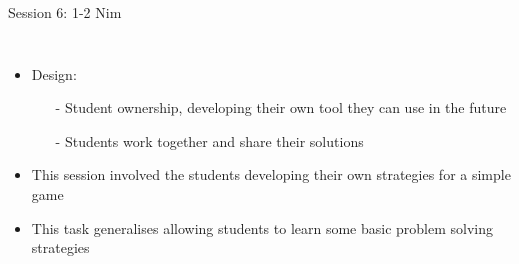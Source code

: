 \documentclass{beamer}  %
\begin{document}
\begin{frame}{Session 6: 1-2 Nim}
    \begin{columns}
            \begin{itemize}
                \item Design:
                \begin{itemize}
                    \item[-] Student ownership, developing their own tool they can use in the future
                    \item[-] Students work together and share their solutions
                \end{itemize}
                \item This session involved the students developing their own strategies for a simple game
                \item This task generalises allowing students to learn some basic problem solving strategies


\end{itemize}
\end{columns}
\end{frame}
\end{document}
